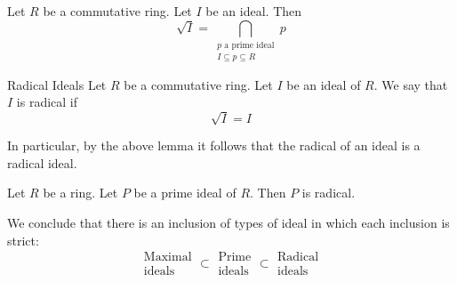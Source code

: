 \documentclass[a4paper]{article}
\begin{document}
\begin{prp}{}{} Let $R$ be a commutative ring. Let $I$ be an ideal. Then $$\sqrt{I}=\bigcap_{\substack{p\text{ a prime ideal}\\I\subseteq p\subseteq R}}p$$
\end{prp}

\begin{defn}{Radical Ideals}{} Let $R$ be a commutative ring. Let $I$ be an ideal of $R$. We say that $I$ is radical if $$\sqrt{I}=I$$
\end{defn}

In particular, by the above lemma it follows that the radical of an ideal is a radical ideal. 

\begin{lmm}{}{} Let $R$ be a ring. Let $P$ be a prime ideal of $R$. Then $P$ is radical. 
\end{lmm}

We conclude that there is an inclusion of types of ideal in which each inclusion is strict: $$\substack{\text{Maximal}\\\text{ideals}}\subset\substack{\text{Prime}\\\text{ideals}}\subset\substack{\text{Radical}\\\text{ideals}}$$
\end{document}
